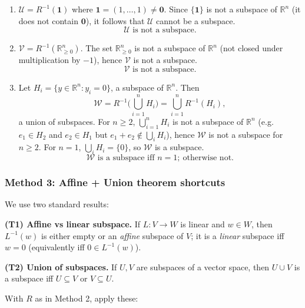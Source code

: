 \documentclass[12pt]{article}
\begin{document}
\begin{enumerate}[label=(\alph*)]
\item $\mathcal{U}=R^{-1}(\mathbf{1})$ where $\mathbf{1}=(1,\ldots,1)\neq \mathbf{0}$. Since $\{\mathbf{1}\}$ is not a subspace of $\mathbb{R}^n$ (it does not contain $\mathbf{0}$), it follows that $\mathcal{U}$ cannot be a subspace.
\[
\boxed{\,\mathcal{U}\text{ is not a subspace.}\,}
\]

\item $\mathcal{V}=R^{-1}(\mathbb{R}_{\ge 0}^n)$. The set $\mathbb{R}_{\ge 0}^n$ is not a subspace of $\mathbb{R}^n$ (not closed under multiplication by $-1$), hence $\mathcal{V}$ is not a subspace.
\[
\boxed{\,\mathcal{V}\text{ is not a subspace.}\,}
\]

\item Let $H_i=\{y\in\mathbb{R}^n:y_i=0\}$, a subspace of $\mathbb{R}^n$. Then
\[
\mathcal{W}=R^{-1}\Big(\bigcup_{i=1}^n H_i\Big)=\bigcup_{i=1}^n R^{-1}(H_i),
\]
a union of subspaces. For $n\ge 2$, $\bigcup_{i=1}^n H_i$ is not a subspace of $\mathbb{R}^n$ (e.g.\ $e_1\in H_2$ and $e_2\in H_1$ but $e_1+e_2\notin \bigcup_i H_i$), hence $\mathcal{W}$ is not a subspace for $n\ge 2$. For $n=1$, $\bigcup_i H_i=\{0\}$, so $\mathcal{W}$ is a subspace.
\[
\boxed{\,\mathcal{W}\text{ is a subspace iff }n=1;\ \text{otherwise not.}\,}
\]
\end{enumerate}
\newpage
\subsubsection{Method 3: Affine + Union theorem shortcuts}
We use two standard results:

\medskip
\noindent\textbf{(T1) Affine vs linear subspace.}
If $L:V\to W$ is linear and $w\in W$, then $L^{-1}(w)$ is either empty or an \emph{affine} subspace of $V$; it is a \emph{linear} subspace iff $w=0$ (equivalently iff $0\in L^{-1}(w)$).

\medskip
\noindent\textbf{(T2) Union of subspaces.}
If $U,V$ are subspaces of a vector space, then $U\cup V$ is a subspace iff $U\subseteq V$ or $V\subseteq U$.

\medskip
With $R$ as in Method 2, apply these:
\end{document}
